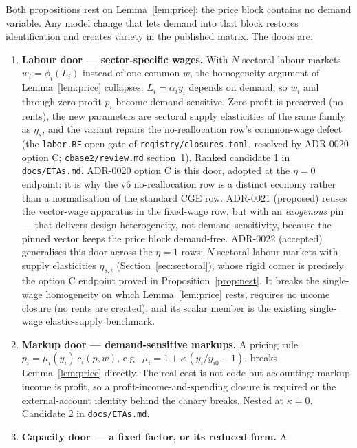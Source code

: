 Both propositions rest on Lemma~\ref{lem:price}: the price block contains
no demand variable. Any model change that lets demand into that block
restores identification and creates variety in the published matrix. The
doors are:

\begin{enumerate}
\item \textbf{Labour door --- sector-specific wages.} With $N$ sectoral
      labour markets $w_i = \phi_i(L_i)$ instead of one common $w$, the
      homogeneity argument of Lemma~\ref{lem:price} collapses: $L_i =
      \alpha_i y_i$ depends on demand, so $w_i$ and through zero profit
      $p_i$ become demand-sensitive. Zero profit is preserved (no rents),
      the new parameters are sectoral supply elasticities of the same
      family as $\eta_s$, and the variant repairs the no-reallocation row's
      common-wage defect (the \texttt{labor.BF} open
      gate of \texttt{registry/closures.toml}, resolved by ADR-0020 option C;
      \texttt{cbase2/review.md} section~1). Ranked candidate 1 in
      \texttt{docs/ETAs.md}. ADR-0020 option C is
      this door, adopted at the $\eta = 0$ endpoint: it is why the v6
      no-reallocation
      row is a distinct economy rather than a normalisation of the standard
      CGE row.
      ADR-0021 (proposed) reuses the vector-wage apparatus in the
      fixed-wage row, but with an \emph{exogenous} pin --- that delivers
      design heterogeneity, not demand-sensitivity, because the pinned
      vector keeps the price block demand-free.
      ADR-0022 (accepted) generalises this door across
      the $\eta = 1$ rows: $N$ sectoral labour markets with supply elasticities
      $\eta_{s,i}$ (Section~\ref{sec:sectoral}), whose rigid corner is precisely
      the option C endpoint proved in Proposition~\ref{prop:nest}. It breaks the
      single-wage homogeneity on which Lemma~\ref{lem:price} rests, requires no
      income closure (no rents are created), and its scalar member is the
      existing single-wage elastic-supply benchmark.
\item \textbf{Markup door --- demand-sensitive markups.} A pricing rule
      $p_i = \mu_i(y_i)\, c_i(p,w)$, e.g.\ $\mu_i = 1 + \kappa\,(y_i/y_{i0}
      - 1)$, breaks Lemma~\ref{lem:price} directly. The real cost is not
      code but accounting: markup income is profit, so a
      profit-income-and-spending closure is required or the external-account
      identity behind the canary breaks. Nested at $\kappa = 0$. Candidate 2
      in \texttt{docs/ETAs.md}.
\item \textbf{Capacity door --- a fixed factor, or its reduced form.} A

\end{enumerate}
